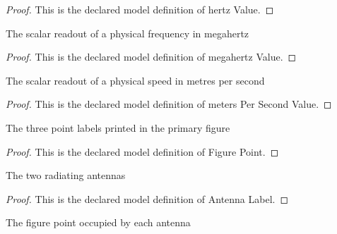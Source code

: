 \begin{proof}
  This is the declared model definition of hertz Value.
\end{proof}
\begin{definition}
  \label{def:physics:phyx-mini-0117:phyxminiproblems-problemphyxmini0117-megahertzvalue}
  The scalar readout of a physical frequency in megahertz
\end{definition}
\begin{proof}
  This is the declared model definition of megahertz Value.
\end{proof}
\begin{definition}
  \label{def:physics:phyx-mini-0117:phyxminiproblems-problemphyxmini0117-meterspersecondvalue}
  The scalar readout of a physical speed in metres per second
\end{definition}
\begin{proof}
  This is the declared model definition of meters Per Second Value.
\end{proof}
\begin{definition}
  \label{def:physics:phyx-mini-0117:phyxminiproblems-problemphyxmini0117-figurepoint}
  The three point labels printed in the primary figure
\end{definition}
\begin{proof}
  This is the declared model definition of Figure Point.
\end{proof}
\begin{definition}
  \label{def:physics:phyx-mini-0117:phyxminiproblems-problemphyxmini0117-antennalabel}
  The two radiating antennas
\end{definition}
\begin{proof}
  This is the declared model definition of Antenna Label.
\end{proof}
\begin{definition}
  \label{def:physics:phyx-mini-0117:phyxminiproblems-problemphyxmini0117-antennalabel-figurepoint}
  The figure point occupied by each antenna
\end{definition}
